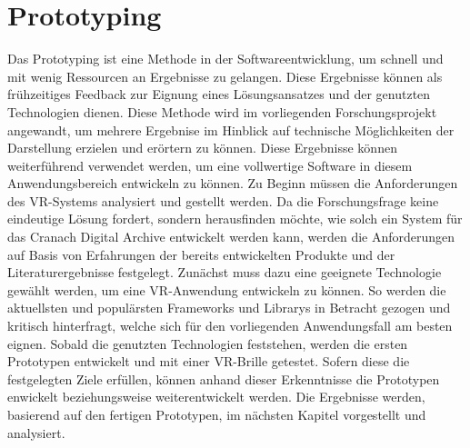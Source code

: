 \documentclass[a4paper,12pt,oneside]{article}
\begin{document}
  \section{Prototyping}
    Das Prototyping ist eine Methode in der Softwareentwicklung, um schnell und mit 
    wenig Ressourcen an Ergebnisse zu gelangen. Diese Ergebnisse können als frühzeitiges
    Feedback zur Eignung eines Lösungsansatzes und der genutzten Technologien dienen.
    Diese Methode wird im vorliegenden Forschungsprojekt angewandt, um mehrere Ergebnise im
    Hinblick auf technische Möglichkeiten der Darstellung erzielen und erörtern zu können.
    Diese Ergebnisse können weiterführend
    verwendet werden, um eine vollwertige Software in diesem Anwendungsbereich
    entwickeln zu können.
    Zu Beginn müssen die Anforderungen des VR-Systems analysiert und gestellt werden. Da
    die Forschungsfrage keine eindeutige Lösung fordert, sondern herausfinden möchte,
    wie solch ein System für das Cranach Digital Archive entwickelt werden kann, werden
    die Anforderungen auf Basis von Erfahrungen der bereits entwickelten Produkte und der 
    Literaturergebnisse festgelegt.
    Zunächst muss dazu eine geeignete Technologie
    gewählt werden, um eine VR-Anwendung entwickeln zu können. So werden die aktuellsten
    und populärsten Frameworks und Librarys in Betracht gezogen und kritisch
    hinterfragt, welche sich für den vorliegenden Anwendungsfall am besten eignen.
    Sobald die genutzten Technologien feststehen, werden die ersten Prototypen entwickelt
    und mit einer VR-Brille getestet. Sofern diese die festgelegten Ziele erfüllen, können
    anhand dieser Erkenntnisse die Prototypen enwickelt beziehungsweise
    weiterentwickelt werden.
    Die Ergebnisse werden, basierend auf den fertigen Prototypen, im 
    nächsten Kapitel vorgestellt und analysiert.
\end{document}
